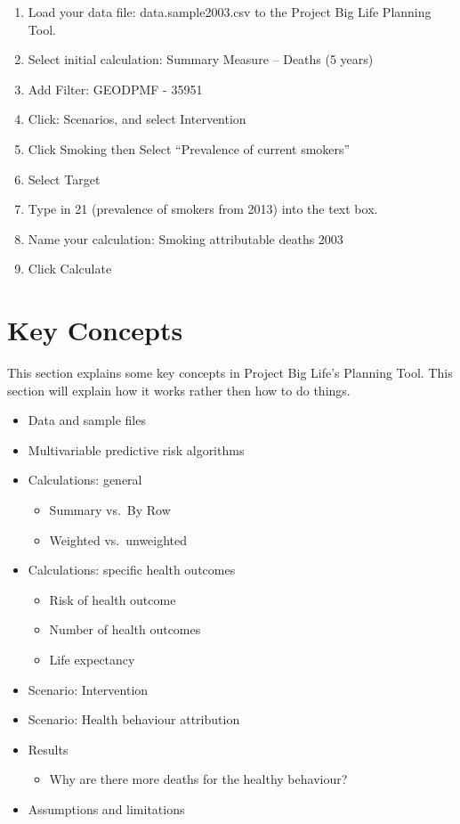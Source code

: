 \documentclass[]{book}
\providecommand{\tightlist}{%
  \setlength{\itemsep}{0pt}\setlength{\parskip}{0pt}}
\begin{document}
\begin{enumerate}
\def\labelenumi{\arabic{enumi}.}
\item
  Load your data file: data.sample2003.csv to the Project Big Life
  Planning Tool.
\item
  Select initial calculation: Summary Measure -- Deaths (5 years)
\item
  Add Filter: GEODPMF - 35951
\item
  Click: Scenarios, and select Intervention
\item
  Click Smoking then Select ``Prevalence of current smokers''
\item
  Select Target
\item
  Type in 21 (prevalence of smokers from 2013) into the text box.
\item
  Name your calculation: Smoking attributable deaths 2003
\item
  Click Calculate
\end{enumerate}

\hypertarget{keyconcepts}{\chapter{Key Concepts}\label{keyconcepts}}

This section explains some key concepts in Project Big Life's Planning
Tool. This section will explain how it works rather then how to do
things.

\begin{itemize}
\item
  Data and sample files
\item
  Multivariable predictive risk algorithms
\item
  Calculations: general

  \begin{itemize}
  \tightlist
  \item
    Summary vs.~By Row
  \item
    Weighted vs.~unweighted
  \end{itemize}
\item
  Calculations: specific health outcomes

  \begin{itemize}
  \tightlist
  \item
    Risk of health outcome
  \item
    Number of health outcomes
  \item
    Life expectancy
  \end{itemize}
\item
  Scenario: Intervention
\item
  Scenario: Health behaviour attribution
\item
  Results

  \begin{itemize}
  \tightlist
  \item
    Why are there more deaths for the healthy behaviour?
  \end{itemize}
\item
  Assumptions and limitations
\end{itemize}
\end{document}

